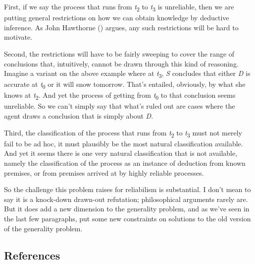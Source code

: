 \documentclass[
  10pt,
  letterpaper,
  DIV=11,
  numbers=noendperiod,
  twoside]{scrartcl}
\begin{document}
First, if we say the process that runs from \emph{t}\textsubscript{2} to
\emph{t}\textsubscript{3} is unreliable, then we are putting general
restrictions on how we can obtain knowledge by deductive inference. As
John Hawthorne () argues, any
such restrictions will be hard to motivate.

Second, the restrictions will have to be fairly sweeping to cover the
range of conclusions that, intuitively, cannot be drawn through this
kind of reasoning. Imagine a variant on the above example where at
\emph{t}\textsubscript{3}, \emph{S} concludes that either \emph{D} is
accurate at \emph{t}\textsubscript{0} or it will snow tomorrow. That's
entailed, obviously, by what she knows at \emph{t}\textsubscript{2}. And
yet the process of getting from \emph{t}\textsubscript{0} to that
conclusion seems unreliable. So we can't simply say that what's ruled
out are cases where the agent draws a conclusion that is simply about
\emph{D}.

Third, the classification of the process that runs from
\emph{t}\textsubscript{2} to \emph{t}\textsubscript{3} must not merely
fail to be ad hoc, it must plausibly be the most natural classification
available. And yet it seems there is one very natural classification
that is not available, namely the classification of the process as an
instance of deduction from known premises, or from premises arrived at
by highly reliable processes.

So the challenge this problem raises for reliabilism is substantial. I
don't mean to say it is a knock-down drawn-out refutation; philosophical
arguments rarely are. But it does add a new dimension to the generality
problem, and as we've seen in the last few paragraphs, put some new
constraints on solutions to the old version of the generality problem.

\subsection*{References}\label{references}
\end{document}

